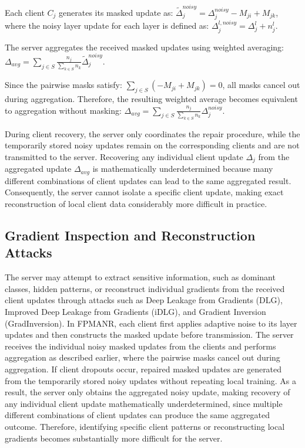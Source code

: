 \documentclass[a4paper,fleqn]{cas-dc}
\begin{document}
Each client $C_{j}$ generates its masked update as: ${\widetilde{\Delta}}_{j}^{noisy} = \Delta_{j}^{noisy} - M_{ji} + M_{jk}$, where the noisy layer update for each layer is defined as: $\Delta_{j}^{l, noisy} = \Delta_{j}^{l} + n_{j}^{l}$.

The server aggregates the received masked updates using weighted averaging: $\Delta_{avg} = \sum_{j \in S}{\frac{n_{j}}{\sum_{k \in S}n_{k}} {\widetilde{\Delta}}_{j}^{noisy}}$.

Since the pairwise masks satisfy: $\sum_{j \in S}{\left( - M_{ji} + M_{jk} \right) = 0}$, all masks cancel out during aggregation. Therefore, the resulting weighted average becomes equivalent to aggregation without masking: $\Delta_{avg} = \sum_{j \in S}{\frac{n_{j}}{\sum_{k \in S}n_{k}} \Delta_{j}^{noisy}}$.

During client recovery, the server only coordinates the repair procedure, while the temporarily stored noisy updates remain on the corresponding clients and are not transmitted to the server. Recovering any individual client update $\Delta_{j}$ from the aggregated update $\Delta_{avg}$ is mathematically underdetermined because many different combinations of client updates can lead to the same aggregated result. Consequently, the server cannot isolate a specific client update, making exact reconstruction of local client data considerably more difficult in practice.

\subsection{Gradient Inspection and Reconstruction Attacks}

The server may attempt to extract sensitive information, such as dominant classes, hidden patterns, or reconstruct individual gradients from the received client updates through attacks such as Deep Leakage from Gradients (DLG), Improved Deep Leakage from Gradients (iDLG), and Gradient Inversion (GradInversion). In FPMANR, each client first applies adaptive noise to its layer updates and then constructs the masked update before transmission. The server receives the individual noisy masked updates from the clients and performs aggregation as described earlier, where the pairwise masks cancel out during aggregation. If client dropouts occur, repaired masked updates are generated from the temporarily stored noisy updates without repeating local training. As a result, the server only obtains the aggregated noisy update, making recovery of any individual client update mathematically underdetermined, since multiple different combinations of client updates can produce the same aggregated outcome. Therefore, identifying specific client patterns or reconstructing local gradients becomes substantially more difficult for the server.
\end{document}
